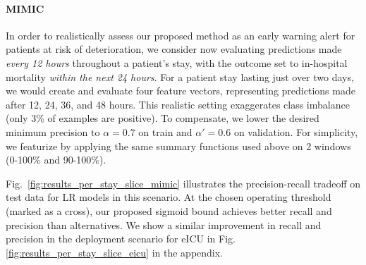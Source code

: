 \paragraph{MIMIC} In order to realistically assess our proposed method as an early warning alert for patients at risk of deterioration, we consider now evaluating predictions made \emph{every 12 hours} throughout a patient's stay, with the outcome set to in-hospital mortality \emph{within the next 24 hours}.
For a patient stay lasting just over two days, we would create and evaluate four feature vectors, representing predictions made after 12, 24, 36, and 48 hours.
This realistic setting exaggerates class imbalance (only 3\% of examples are positive). To compensate, we lower the desired minimum precision to $\alpha=0.7$ on train and $\alpha'=0.6$ on validation.
For simplicity, we featurize by applying the same summary functions used above on 2 windows (0-100\% and 90-100\%). 

Fig.~\ref{fig:results_per_stay_slice_mimic} illustrates the precision-recall tradeoff on test data for LR models in this scenario. At the chosen operating threshold (marked as a cross), our proposed sigmoid bound achieves better recall and precision than alternatives. We show a similar improvement in recall and precision in the deployment scenario for eICU in Fig. \ref{fig:results_per_stay_slice_eicu} in the appendix.





